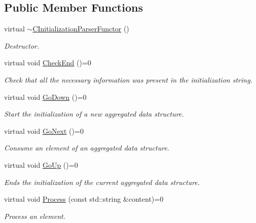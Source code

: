 \subsection*{Public Member Functions}
\begin{DoxyCompactItemize}
\item 
virtual \hyperlink{classCInitializationParserFunctor_a1664fd9a14befd2f87791dcd694d8416}{$\sim$\+C\+Initialization\+Parser\+Functor} ()
\begin{DoxyCompactList}\small\item\em Destructor. \end{DoxyCompactList}\item 
virtual void \hyperlink{classCInitializationParserFunctor_aa639277133d141fd3aeed2add158c920}{Check\+End} ()=0
\begin{DoxyCompactList}\small\item\em Check that all the necessary information was present in the initialization string. \end{DoxyCompactList}\item 
virtual void \hyperlink{classCInitializationParserFunctor_acd23f951887db083c2c02d4e0865e260}{Go\+Down} ()=0
\begin{DoxyCompactList}\small\item\em Start the initialization of a new aggregated data structure. \end{DoxyCompactList}\item 
virtual void \hyperlink{classCInitializationParserFunctor_a4f9a305b8ecfba8a372583123b2878ed}{Go\+Next} ()=0
\begin{DoxyCompactList}\small\item\em Consume an element of an aggregated data structure. \end{DoxyCompactList}\item 
virtual void \hyperlink{classCInitializationParserFunctor_ac502a0c076635becd22e65f2281c5c46}{Go\+Up} ()=0
\begin{DoxyCompactList}\small\item\em Ends the initialization of the current aggregated data structure. \end{DoxyCompactList}\item 
virtual void \hyperlink{classCInitializationParserFunctor_ac84560143f5dcbb961ba1a8f43fea9a1}{Process} (const std\+::string \&content)=0
\begin{DoxyCompactList}\small\item\em Process an element. \end{DoxyCompactList}\end{DoxyCompactItemize}
